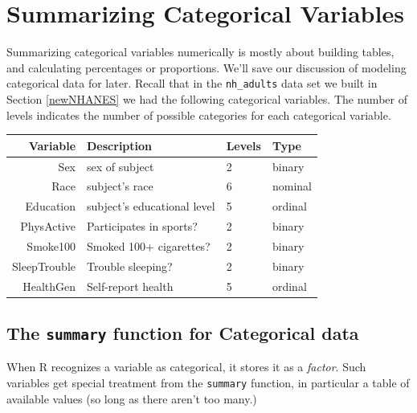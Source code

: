 \documentclass[
]{book}
\newenvironment{Shaded}{\begin{snugshade}}{\end{snugshade}}
\newcommand{\KeywordTok}[1]{\textcolor[rgb]{0.13,0.29,0.53}{\textbf{#1}}}
\newcommand{\NormalTok}[1]{#1}
\newcommand{\OperatorTok}[1]{\textcolor[rgb]{0.81,0.36,0.00}{\textbf{#1}}}
\newcommand{\StringTok}[1]{\textcolor[rgb]{0.31,0.60,0.02}{#1}}
\begin{document}
\hypertarget{summarizing-categorical-variables}{%
\chapter{Summarizing Categorical Variables}\label{summarizing-categorical-variables}}

Summarizing categorical variables numerically is mostly about building tables, and calculating percentages or proportions. We'll save our discussion of modeling categorical data for later. Recall that in the \texttt{nh\_adults} data set we built in Section \ref{newNHANES} we had the following categorical variables. The number of levels indicates the number of possible categories for each categorical variable.

\begin{longtable}[]{@{}rlll@{}}
\toprule
Variable & Description & Levels & Type\tabularnewline
\midrule
\endhead
Sex & sex of subject & 2 & binary\tabularnewline
Race & subject's race & 6 & nominal\tabularnewline
Education & subject's educational level & 5 & ordinal\tabularnewline
PhysActive & Participates in sports? & 2 & binary\tabularnewline
Smoke100 & Smoked 100+ cigarettes? & 2 & binary\tabularnewline
SleepTrouble & Trouble sleeping? & 2 & binary\tabularnewline
HealthGen & Self-report health & 5 & ordinal\tabularnewline
\bottomrule
\end{longtable}

\hypertarget{the-summary-function-for-categorical-data}{%
\section{\texorpdfstring{The \texttt{summary} function for Categorical data}{The summary function for Categorical data}}\label{the-summary-function-for-categorical-data}}

When R recognizes a variable as categorical, it stores it as a \emph{factor}. Such variables get special treatment from the \texttt{summary} function, in particular a table of available values (so long as there aren't too many.)

\begin{Shaded}
\end{Shaded}
\end{document}

